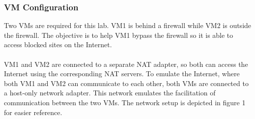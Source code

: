 \documentclass[a4paper,12pt]{article}
\begin{document}
	\subsubsection{VM Configuration}
	Two VMs are required for this lab. VM1 is behind a firewall while VM2 is outside the firewall. The objective is to help VM1 bypass the firewall so it is able to access blocked sites on the Internet.\\\\VM1 and VM2 are connected to a separate NAT adapter, so both can access the Internet using the corresponding NAT servers. To emulate the Internet, where both VM1 and VM2 can communicate to each other, both VMs are connected to a host-only network adapter. This network emulates the facilitation of communication between the two VMs. The network setup is depicted in figure 1 for easier reference.
	
\end{document}
